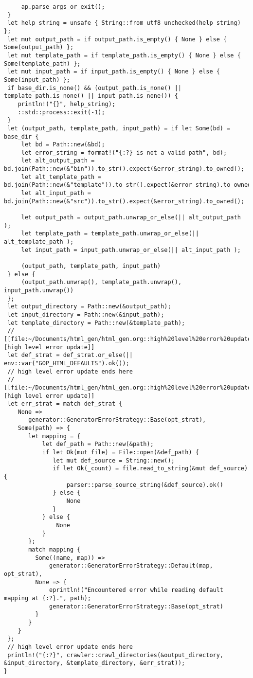 \documentclass[11pt]{article}
\begin{document}
\begin{verbatim}
     ap.parse_args_or_exit();
 }
 let help_string = unsafe { String::from_utf8_unchecked(help_string) };
 let mut output_path = if output_path.is_empty() { None } else { Some(output_path) };
 let mut template_path = if template_path.is_empty() { None } else { Some(template_path) };
 let mut input_path = if input_path.is_empty() { None } else { Some(input_path) };
 if base_dir.is_none() && (output_path.is_none() || template_path.is_none() || input_path.is_none()) {
    println!("{}", help_string);
    ::std::process::exit(-1);
 }
 let (output_path, template_path, input_path) = if let Some(bd) = base_dir {
     let bd = Path::new(&bd);
     let error_string = format!("{:?} is not a valid path", bd);
     let alt_output_path = bd.join(Path::new(&"bin")).to_str().expect(&error_string).to_owned();
     let alt_template_path = bd.join(Path::new(&"template")).to_str().expect(&error_string).to_owned();
     let alt_input_path = bd.join(Path::new(&"src")).to_str().expect(&error_string).to_owned();

     let output_path = output_path.unwrap_or_else(|| alt_output_path );
     let template_path = template_path.unwrap_or_else(|| alt_template_path );
     let input_path = input_path.unwrap_or_else(|| alt_input_path );

     (output_path, template_path, input_path)
 } else {
     (output_path.unwrap(), template_path.unwrap(), input_path.unwrap())
 };
 let output_directory = Path::new(&output_path);
 let input_directory = Path::new(&input_path);
 let template_directory = Path::new(&template_path);
 // [[file:~/Documents/html_gen/html_gen.org::high%20level%20error%20update][high level error update]]
 let def_strat = def_strat.or_else(|| env::var("GOP_HTML_DEFAULTS").ok());
 // high level error update ends here
 // [[file:~/Documents/html_gen/html_gen.org::high%20level%20error%20update][high level error update]]
 let err_strat = match def_strat {
    None => 
       generator::GeneratorErrorStrategy::Base(opt_strat),
    Some(path) => {
       let mapping = { 
           let def_path = Path::new(&path);
           if let Ok(mut file) = File::open(&def_path) {
              let mut def_source = String::new();
              if let Ok(_count) = file.read_to_string(&mut def_source) {
                  parser::parse_source_string(&def_source).ok()
              } else {
                  None
              }
           } else {
               None
           } 
       };
       match mapping {
         Some((name, map)) => 
             generator::GeneratorErrorStrategy::Default(map, opt_strat), 
         None => {
             eprintln!("Encountered error while reading default mapping at {:?}.", path);
             generator::GeneratorErrorStrategy::Base(opt_strat)
         }
       }
    }
 };
 // high level error update ends here
 println!("{:?}", crawler::crawl_directories(&output_directory, &input_directory, &template_directory, &err_strat));
}
\end{verbatim}
\end{document}
